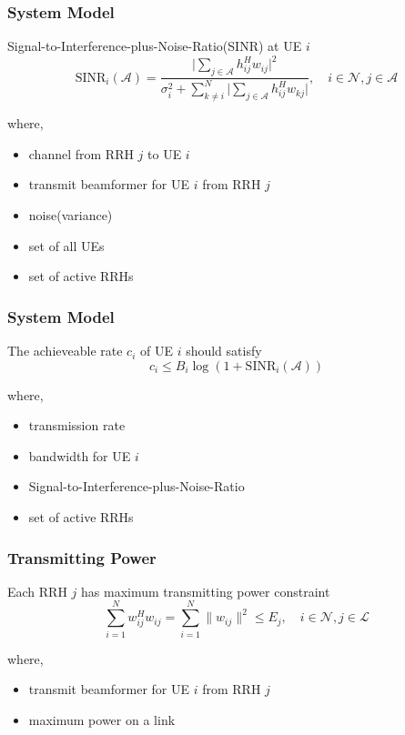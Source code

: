 \documentclass[usenames,dvipsnames]{beamer}
\begin{document}
\begin{frame}
  \frametitle{System Model}
  \begin{exampleblock}{Signal-to-Interference-plus-Noise-Ratio(SINR) at UE $i$}
    \[
      \text{SINR}_{i}(\mathcal{A}) = \frac{\bigg\lvert\sum\limits_{j\in{\mathcal{A}}}^{}h_{ij}^{H}w_{ij}\bigg\rvert^2}{\sigma_{i}^2 + \sum\limits_{k\neq i}^{N}\bigg\lvert\sum\limits_{j\in{\mathcal{A}}}^{}h_{ij}^{H}w_{kj}\bigg\rvert},\quad i\in\mathcal{N},j\in\mathcal{A}
    \]
  \end{exampleblock}
  where,
  \begin{itemize}
    \item { channel from RRH $j$ to UE $i$}
    \item { transmit beamformer for UE $i$ from RRH $j$}
    \item { noise(variance)}
    \item { set of all UEs}
    \item { set of active RRHs}
    \end{itemize}
\end{frame}
\begin{frame}
  \frametitle{System Model}
  \begin{exampleblock}{The achieveable rate $c_{i}$ of UE $i$ should satisfy}
    \[
      c_{i} \leq B_{i}\log(1+\text{SINR}_{i}(\mathcal{A})) 
    \] 
  \end{exampleblock}
  where,
  \begin{itemize}
    \item { transmission rate}
    \item { bandwidth for UE $i$}
    \item { Signal-to-Interference-plus-Noise-Ratio}
    \item { set of active RRHs}
  \end{itemize}
\end{frame}
\begin{frame}
  \frametitle{Transmitting Power}
  \begin{exampleblock}{Each RRH $j$ has maximum transmitting power constraint}
    \[
      \sum_{i = 1}^{N}w_{ij}^{H}w_{ij}  = \sum_{i = 1}^{N} \lVert w_{ij}\rVert^2 \leq E_{j},\quad i\in\mathcal{N},j\in\mathcal{L}
    \]
  \end{exampleblock}
  where,
  \begin{itemize}
    \item { transmit beamformer for UE $i$ from RRH $j$}
    \item { maximum power on a link}
  \end{itemize}
\end{frame}
\end{document}
